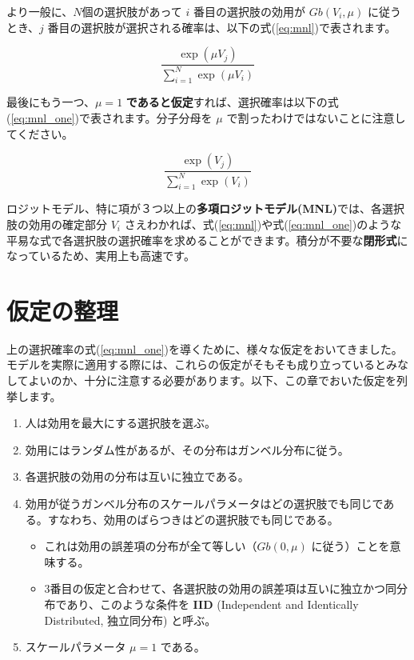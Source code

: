 より一般に、$N$個の選択肢があって $i$ 番目の選択肢の効用が $Gb(V_i, \mu)$ に従うとき、$j$ 番目の選択肢が選択される確率は、以下の式(\ref{eq:mnl})で表されます。

\begin{equation}
    \label{eq:mnl}
    \frac{\exp(\mu V_j)}{\sum_{i=1}^N \exp(\mu V_i)}
\end{equation}

最後にもう一つ、$\mu=1$ \textbf{であると仮定}すれば、選択確率は以下の式(\ref{eq:mnl_one})で表されます。分子分母を $\mu$ で割ったわけではないことに注意してください。

\begin{equation}
    \label{eq:mnl_one}
    \frac{\exp(V_j)}{\sum_{i=1}^N \exp(V_i)}
\end{equation}

ロジットモデル、特に項が３つ以上の\textbf{多項ロジットモデル(MNL)}では、各選択肢の効用の確定部分 $V_i$ さえわかれば、式(\ref{eq:mnl})や式(\ref{eq:mnl_one})のような平易な式で各選択肢の選択確率を求めることができます。積分が不要な\textbf{閉形式}になっているため、実用上も高速です。

\section{仮定の整理}\label{sec:assumption}

上の選択確率の式(\ref{eq:mnl_one})を導くために、様々な仮定をおいてきました。モデルを実際に適用する際には、これらの仮定がそもそも成り立っているとみなしてよいのか、十分に注意する必要があります。以下、この章でおいた仮定を列挙します。

\begin{enumerate}
    \item 人は効用を最大にする選択肢を選ぶ。
    \item 効用にはランダム性があるが、その分布はガンベル分布に従う。
    \item 各選択肢の効用の分布は互いに独立である。
    \item 効用が従うガンベル分布のスケールパラメータはどの選択肢でも同じである。すなわち、効用のばらつきはどの選択肢でも同じである。
          \begin{itemize}
              \item これは効用の誤差項の分布が全て等しい（$Gb(0,\mu)$ に従う）ことを意味する。
              \item 3番目の仮定と合わせて、各選択肢の効用の誤差項は互いに独立かつ同分布であり、このような条件を \textbf{IID} (Independent and Identically Distributed, 独立同分布) と呼ぶ。
          \end{itemize}
    \item スケールパラメータ $\mu=1$ である。
\end{enumerate}

